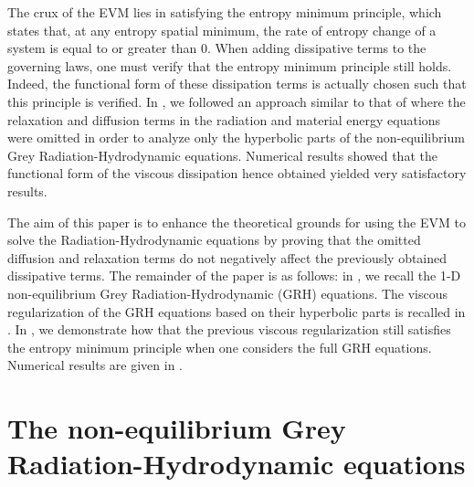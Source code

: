 \documentclass{mc2015}
\begin{document}
The crux of the EVM lies in satisfying the entropy minimum principle, which states that, at any entropy spatial minimum, the rate of entropy change of a system is equal to or greater than 0. When
adding dissipative terms to the governing laws, one must verify that the entropy minimum principle still holds. Indeed, the functional form of these dissipation terms
is actually chosen such that this principle is verified. In \cite{our_jcp_radhy_paper}, we followed an approach similar to that of \cite{Balsara, LowrieMorel} 
where the relaxation and diffusion terms in the radiation and material energy equations were omitted in order to analyze only the hyperbolic parts of 
the non-equilibrium Grey Radiation-Hydrodynamic equations. Numerical results showed that the functional form of the viscous dissipation hence obtained 
yielded very satisfactory results. 

The aim of this paper is to enhance the theoretical grounds for using the EVM to solve the  Radiation-Hydrodynamic equations by proving that the omitted diffusion
and relaxation terms do not negatively affect the previously obtained dissipative terms. The remainder of the paper is as follows: in , we recall
the 1-D non-equilibrium Grey Radiation-Hydrodynamic (GRH) equations. The viscous regularization of the GRH equations based on their hyperbolic parts is recalled in .
In , we demonstrate how that the previous viscous regularization still satisfies the entropy minimum principle when one considers the full GRH equations.
Numerical results are given in . 

\section{The non-equilibrium Grey Radiation-Hydrodynamic equations}\label{sec:GRH}
\end{document}

